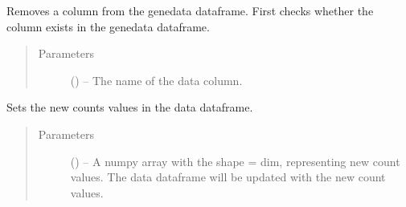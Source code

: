 \documentclass[letterpaper,10pt,english]{sphinxmanual}
\begin{document}
\begin{fulllineitems}
\begin{fulllineitems}
\end{fulllineitems}


\begin{fulllineitems}
\label{\detokenize{index:singlecelldata.SingleCell.removeGeneData}}
Removes a column from the genedata dataframe. First checks
whether the column exists in the genedata dataframe.
\begin{quote}\begin{description}
\item[{Parameters}] \leavevmode
{} () – The name of the data column.

\end{description}\end{quote}

\end{fulllineitems}


\begin{fulllineitems}
\label{\detokenize{index:singlecelldata.SingleCell.setCounts}}
Sets the new counts values in the data dataframe.
\begin{quote}\begin{description}
\item[{Parameters}] \leavevmode
{} () – A numpy array with the shape = dim, representing new count values. The data dataframe will
be updated with the new count values.

\end{description}\end{quote}

\end{fulllineitems}


\end{fulllineitems}



\renewcommand{\indexname}{Python Module Index}
\begin{sphinxtheindex}
\let\bigletter\sphinxstyleindexlettergroup
\bigletter{s}
\item\relax{}
\end{sphinxtheindex}

\renewcommand{\indexname}{Index}
\footnotesize\raggedright\printindex
\end{document}
